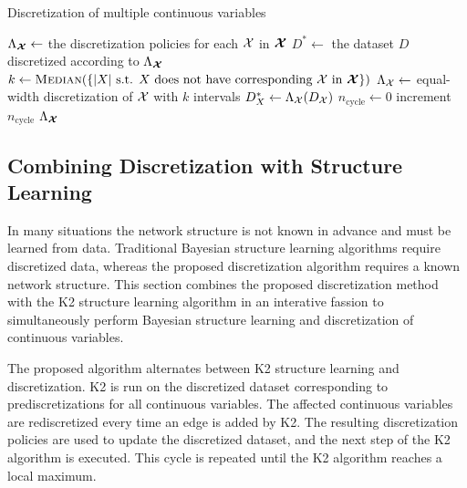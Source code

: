 \begin{algorithm}
  \caption{Discretization of multiple continuous variables}
  \label{alg:disc_two}
  \begin{algorithmic}[5]
    \State $\Lambda_{\bm{\mathcal{X}}} \leftarrow$ the discretization policies for each $\mathcal{X}$ in $\bm{\mathcal{X}}$
    \State $D^* \leftarrow $ the dataset $D$ discretized according to $\Lambda_{\bm{\mathcal{X}}}$
    \State $k \leftarrow \textsc{Median}\paren{\curly{ |X| \text{ s.t. } X \text{ does not have corresponding } \cX \text{ in } \bm{\cX} }}$
      \State $\Lambda_{\mathcal{X}} \leftarrow$ equal-width discretization of $\mathcal{X}$ with $k$ intervals
      \State $D^*_{X} \leftarrow \Lambda_{\cX} \paren{D_{\cX}}$
    \EndFor
    \State $n_\text{cycle} \leftarrow 0$
      \State increment {$n_\text{cycle}$}
      \EndFor
    \EndWhile
    \State \Return $\Lambda_{\bm{\mathcal{X}}}$
  \EndFunction
  \end{algorithmic}
\end{algorithm}

\subsection{Combining Discretization with Structure Learning}

In many situations the network structure is not known in advance and must be learned from data.
Traditional Bayesian structure learning algorithms require discretized data, whereas the proposed discretization algorithm requires a known network structure.
This section combines the proposed discretization method with the K2 structure learning algorithm \citep{K2} in an interative fassion to simultaneously perform Bayesian structure learning and discretization of continuous variables.

The proposed algorithm alternates between K2 structure learning and discretization.
K2 is run on the discretized dataset corresponding to prediscretizations for all continuous variables.
The affected continuous variables are rediscretized every time an edge is added by K2.
The resulting discretization policies are used to update the discretized dataset, and the next step of the K2 algorithm is executed.
This cycle is repeated until the K2 algorithm reaches a local maximum.

